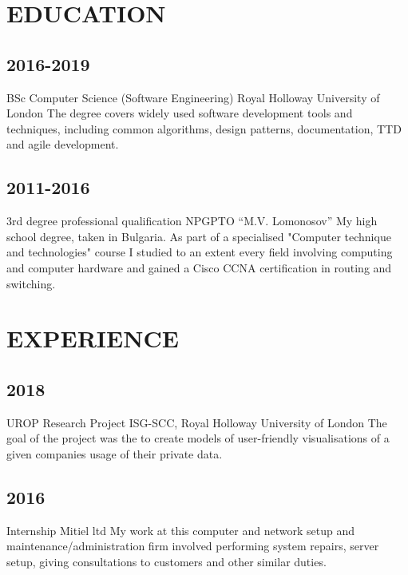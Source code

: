 \documentclass{CVClass}
\begin{document}
\begin{minipage}[t][18cm]{0.6\textwidth}
    \section{EDUCATION}{
		\subsection[https://www.royalholloway.ac.uk/studying-here/undergraduate/computer-science/computer-science-software-engineering/]
		{2016-2019}
		{BSc Computer Science (Software Engineering)}
		{Royal Holloway University of London}
		{
			The degree covers widely used software development tools and techniques, including common algorithms, design patterns, documentation, TTD and agile development.
		}
		\vskip2mm
		\subsection[https://lomonosov-bg.com/]
		{2011-2016}
		{3rd degree professional qualification}
		{NPGPTO “M.V. Lomonosov”}
		{
			My high school degree, taken in Bulgaria. As part of a specialised "Computer technique and technologies" course I studied to an extent every field involving computing and computer hardware and gained a Cisco CCNA certification in routing and switching.
		}
		\vskip4mm
		\section{EXPERIENCE}
		\vskip1mm
		\subsection[https://scc.rhul.ac.uk/research/interns/kaloian-chokanov/]
		{2018}
		{UROP Research Project}
		{ISG-SCC, Royal Holloway University of London}
		{
			The goal of the project was the to create models of user-friendly visualisations of a given companies usage of their private data.
			\
		}
		\vskip2mm
		\subsection[https://www.mitiel.com/]
		{2016}
		{Internship}
		{Mitiel ltd}
		{
			My work at this computer and network setup and maintenance/administration firm involved performing system repairs, server setup, giving consultations to customers and other similar duties.
		}
	}


\end{minipage}
\end{document}
